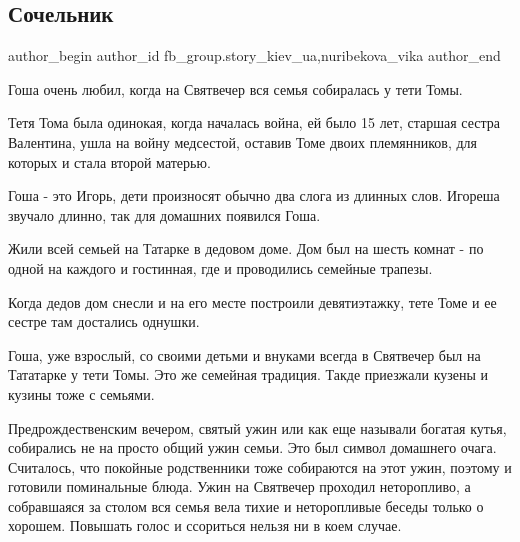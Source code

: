  
 
 
 
 
 
\subsection{Сочельник}
\label{sec:07_01_2022.fb.fb_group.story_kiev_ua.1.sochelnik}
 
\ifcmt
 author_begin
   author_id fb_group.story_kiev_ua,nuribekova_vika
 author_end
\fi

Гоша очень любил, когда на Святвечер вся семья собиралась у тети Томы. 

Тетя Тома была одинокая, когда началась война, ей было 15 лет, старшая сестра
Валентина, ушла на войну медсестой, оставив Томе двоих племянников, для которых
и стала второй матерью. 


Гоша - это Игорь, дети произносят обычно два слога из длинных слов. Игореша
звучало  длинно, так для домашних появился Гоша.

Жили всей семьей на Татарке в дедовом доме. Дом был на шесть комнат - по одной
на каждого и гостинная, где и проводились семейные трапезы.


Когда дедов дом снесли и на его месте построили девятиэтажку, тете Томе и ее
сестре там достались однушки. 

Гоша, уже взрослый, со своими детьми и внуками всегда в Святвечер был на
Тататарке у тети Томы. Это же семейная традиция. Такде приезжали кузены и
кузины тоже с семьями.


Предрождественским вечером, святый ужин или как еще называли богатая кутья,
собирались не на просто общий ужин семьи. Это был символ домашнего очага.
Считалось, что покойные родственники тоже собираются на этот ужин, поэтому и
готовили поминальные блюда. Ужин на Святвечер проходил неторопливо, а
собравшаяся за столом вся семья вела тихие и неторопливые беседы только о
хорошем. Повышать голос и ссориться нельзя ни в коем случае. 


